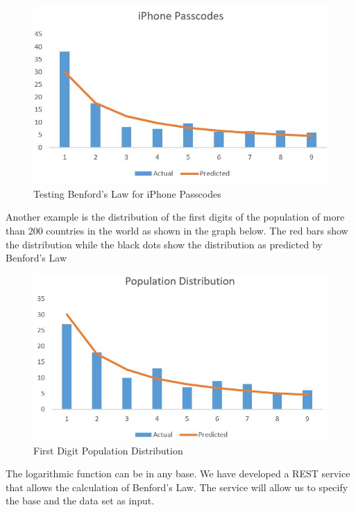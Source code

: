 \begin{figure}[!ht]
\centering\includegraphics[width=\columnwidth]{images/iphone_benford.JPG}
  \caption{Testing Benford's Law for iPhone Passcodes}\label{f:iphone-pass_ben}
\end{figure}


Another example is the distribution of the first 
digits of the population of more than 200 countries 
in the world as shown in the graph below. 
The red bars show the distribution while 
the black dots show the distribution as 
predicted by Benford’s Law~\cite{hid-sp18-514-benfordwiki}

\begin{figure}[!ht]
\centering\includegraphics[width=\columnwidth]{images/benford_country.JPG}
  \caption{First Digit Population Distribution}\label{f:pop-dist-countries}
\end{figure}

The logarithmic function can be in any base. 
We have developed a REST service that allows
the calculation of Benford's Law. 
The service will allow us to specify 
the base and the data set as input. 

